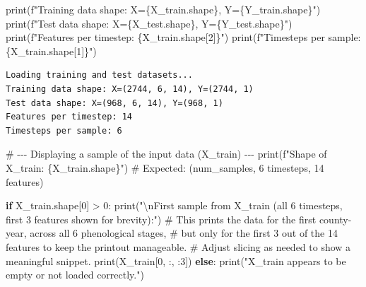 \documentclass[
  letterpaper,
  DIV=11,
  numbers=noendperiod]{scrreprt}
\newenvironment{Shaded}{\begin{snugshade}}{\end{snugshade}}
\newcommand{\BuiltInTok}[1]{\textcolor[rgb]{0.00,0.23,0.31}{#1}}
\newcommand{\CharTok}[1]{\textcolor[rgb]{0.13,0.47,0.30}{#1}}
\newcommand{\CommentTok}[1]{\textcolor[rgb]{0.37,0.37,0.37}{#1}}
\newcommand{\ControlFlowTok}[1]{\textcolor[rgb]{0.00,0.23,0.31}{\textbf{#1}}}
\newcommand{\DecValTok}[1]{\textcolor[rgb]{0.68,0.00,0.00}{#1}}
\newcommand{\NormalTok}[1]{\textcolor[rgb]{0.00,0.23,0.31}{#1}}
\newcommand{\OperatorTok}[1]{\textcolor[rgb]{0.37,0.37,0.37}{#1}}
\newcommand{\SpecialCharTok}[1]{\textcolor[rgb]{0.37,0.37,0.37}{#1}}
\newcommand{\SpecialStringTok}[1]{\textcolor[rgb]{0.13,0.47,0.30}{#1}}
\newcommand{\StringTok}[1]{\textcolor[rgb]{0.13,0.47,0.30}{#1}}
\begin{document}
\begin{Shaded}
\begin{Highlighting}[]
\BuiltInTok{print}\NormalTok{(}\SpecialStringTok{f"Training data shape: X=}\SpecialCharTok{\{}\NormalTok{X\_train}\SpecialCharTok{.}\NormalTok{shape}\SpecialCharTok{\}}\SpecialStringTok{, Y=}\SpecialCharTok{\{}\NormalTok{Y\_train}\SpecialCharTok{.}\NormalTok{shape}\SpecialCharTok{\}}\SpecialStringTok{"}\NormalTok{)}
\BuiltInTok{print}\NormalTok{(}\SpecialStringTok{f"Test data shape: X=}\SpecialCharTok{\{}\NormalTok{X\_test}\SpecialCharTok{.}\NormalTok{shape}\SpecialCharTok{\}}\SpecialStringTok{, Y=}\SpecialCharTok{\{}\NormalTok{Y\_test}\SpecialCharTok{.}\NormalTok{shape}\SpecialCharTok{\}}\SpecialStringTok{"}\NormalTok{)}
\BuiltInTok{print}\NormalTok{(}\SpecialStringTok{f"Features per timestep: }\SpecialCharTok{\{}\NormalTok{X\_train}\SpecialCharTok{.}\NormalTok{shape[}\DecValTok{2}\NormalTok{]}\SpecialCharTok{\}}\SpecialStringTok{"}\NormalTok{)}
\BuiltInTok{print}\NormalTok{(}\SpecialStringTok{f"Timesteps per sample: }\SpecialCharTok{\{}\NormalTok{X\_train}\SpecialCharTok{.}\NormalTok{shape[}\DecValTok{1}\NormalTok{]}\SpecialCharTok{\}}\SpecialStringTok{"}\NormalTok{)}
\end{Highlighting}
\end{Shaded}

\begin{verbatim}
Loading training and test datasets...
Training data shape: X=(2744, 6, 14), Y=(2744, 1)
Test data shape: X=(968, 6, 14), Y=(968, 1)
Features per timestep: 14
Timesteps per sample: 6
\end{verbatim}

\begin{Shaded}
\begin{Highlighting}[]
\CommentTok{\# {-}{-}{-} Displaying a sample of the input data (X\_train) {-}{-}{-}}
\BuiltInTok{print}\NormalTok{(}\SpecialStringTok{f"Shape of X\_train: }\SpecialCharTok{\{}\NormalTok{X\_train}\SpecialCharTok{.}\NormalTok{shape}\SpecialCharTok{\}}\SpecialStringTok{"}\NormalTok{) }\CommentTok{\# Expected: (num\_samples, 6 timesteps, 14 features)}

\ControlFlowTok{if}\NormalTok{ X\_train.shape[}\DecValTok{0}\NormalTok{] }\OperatorTok{\textgreater{}} \DecValTok{0}\NormalTok{:}
    \BuiltInTok{print}\NormalTok{(}\StringTok{"}\CharTok{\textbackslash{}n}\StringTok{First sample from X\_train (all 6 timesteps, first 3 features shown for brevity):"}\NormalTok{)}
    \CommentTok{\# This prints the data for the first county{-}year, across all 6 phenological stages,}
    \CommentTok{\# but only for the first 3 out of the 14 features to keep the printout manageable.}
    \CommentTok{\# Adjust slicing as needed to show a meaningful snippet.}
    \BuiltInTok{print}\NormalTok{(X\_train[}\DecValTok{0}\NormalTok{, :, :}\DecValTok{3}\NormalTok{])}
\ControlFlowTok{else}\NormalTok{:}
    \BuiltInTok{print}\NormalTok{(}\StringTok{"X\_train appears to be empty or not loaded correctly."}\NormalTok{)}
\end{Highlighting}
\end{Shaded}
\end{document}
